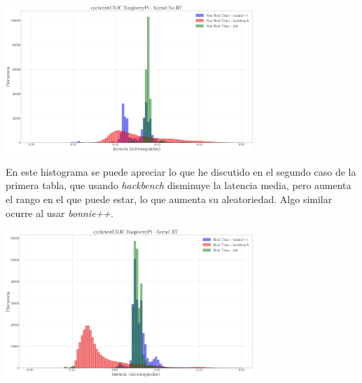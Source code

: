 \documentclass[12pt, a4paper]{report}
\begin{document}
	\begin{center}
		\includegraphics[width=0.7\textwidth]{noRt}
	\end{center}
	En este histograma se puede apreciar lo que he discutido en el segundo caso de la primera tabla, que usando \textit{hackbench} disminuye la latencia media, pero aumenta el rango en el que puede estar, lo que aumenta su aleatoriedad. Algo similar ocurre al usar \textit{bonnie++}. 
	\begin{center}
		\includegraphics[width=0.7\textwidth]{Rt}
	\end{center}
\end{document}

